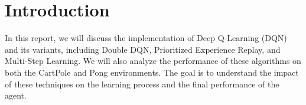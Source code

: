 \section{Introduction}
\label{sec:introduction}

In this report, we will discuss the implementation of Deep Q-Learning (DQN) and its variants, including Double DQN, Prioritized Experience Replay, and Multi-Step Learning. We will also analyze the performance of these algorithms on both the CartPole and Pong environments. The goal is to understand the impact of these techniques on the learning process and the final performance of the agent.
